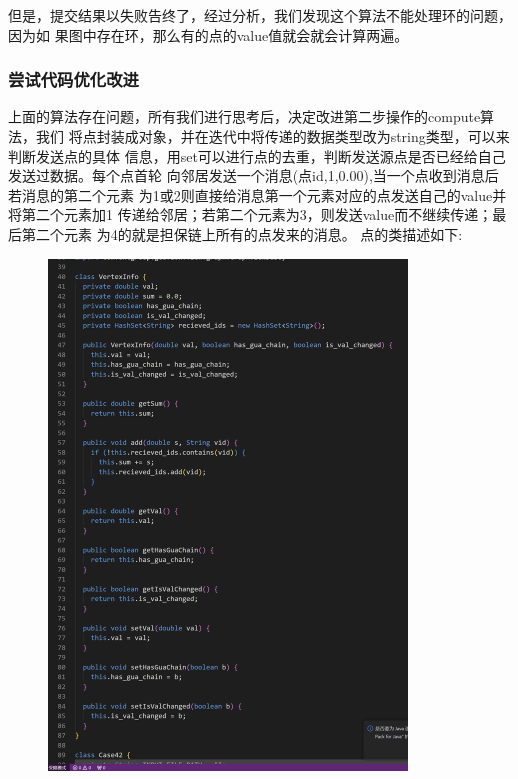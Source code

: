 但是，提交结果以失败告终了，经过分析，我们发现这个算法不能处理环的问题，因为如
果图中存在环，那么有的点的value值就会就会计算两遍。

\subsubsection{尝试代码优化改进}
上面的算法存在问题，所有我们进行思考后，决定改进第二步操作的compute算法，我们
将点封装成对象，并在迭代中将传递的数据类型改为string类型，可以来判断发送点的具体
信息，用set可以进行点的去重，判断发送源点是否已经给自己发送过数据。每个点首轮
向邻居发送一个消息(点id,1,0.00),当一个点收到消息后若消息的第二个元素
为1或2则直接给消息第一个元素对应的点发送自己的value并将第二个元素加1
传递给邻居；若第二个元素为3，则发送value而不继续传递；最后第二个元素
为4的就是担保链上所有的点发来的消息。
点的类描述如下:
\begin{figure}[H]
  \begin{center}
    \includegraphics[width=0.85\textwidth,scale=0.7]{./figures/pro3/7.png}
  \end{center}
\end{figure}

